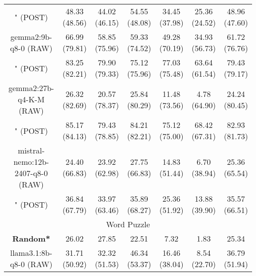 \begin{table}[]
{\begin{tabular}{ccccccc}
        

        \multicolumn{1}{c|}{" (POST)} & 48.33 (48.56) & 44.02 (46.15) & \multicolumn{1}{c|}{54.55 (48.08)} & 34.45 (37.98) & \multicolumn{1}{c|}{25.36 (24.52)} & 48.96 (47.60) \\
        \cline{1-7}
        

        \multicolumn{1}{c|}{gemma2:9b-q8-0 (RAW)} & 66.99 (79.81) & 58.85 (75.96) & \multicolumn{1}{c|}{59.33 (74.52)} & 49.28 (70.19) & \multicolumn{1}{c|}{34.93 (56.73)} & 61.72 (76.76) \\
        
        

        \multicolumn{1}{c|}{" (POST)} & 83.25 (82.21) & 79.90 (79.33) & \multicolumn{1}{c|}{75.12 (75.96)} & 77.03 (75.48) & \multicolumn{1}{c|}{63.64 (61.54)} & 79.43 (79.17) \\
        \cline{1-7}
        

        \multicolumn{1}{c|}{gemma2:27b-q4-K-M (RAW)} & 26.32 (82.69) & 20.57 (78.37) & \multicolumn{1}{c|}{25.84 (80.29)} & 11.48 (73.56) & \multicolumn{1}{c|}{4.78 (64.90)} & 24.24 (80.45) \\
        
        

        \multicolumn{1}{c|}{" (POST)} & 85.17 (84.13) & 79.43 (78.85) & \multicolumn{1}{c|}{84.21 (82.21)} & 75.12 (75.00) & \multicolumn{1}{c|}{68.42 (67.31)} & 82.93 (81.73) \\
        \cline{1-7}
        

        \multicolumn{1}{c|}{mistral-nemo:12b-2407-q8-0 (RAW)} & 24.40 (66.83) & 23.92 (62.98) & \multicolumn{1}{c|}{27.75 (66.83)} & 14.83 (51.44) & \multicolumn{1}{c|}{6.70 (38.94)} & 25.36 (65.54) \\
        
        

        \multicolumn{1}{c|}{" (POST)} & 36.84 (67.79) & 33.97 (63.46) & \multicolumn{1}{c|}{35.89 (68.27)} & 25.36 (51.92) & \multicolumn{1}{c|}{13.88 (39.90)} & 35.57 (66.51) \\
        \cline{1-7}
        
\hline
\multicolumn{7}{c}{Word Puzzle} \\ \hline
\multicolumn{1}{c|}{\textbf{Random*}} & 26.02 & 27.85 & \multicolumn{1}{c|}{22.51} & 7.32 & \multicolumn{1}{c|}{1.83} & 25.34 \\ \hline

        \multicolumn{1}{c|}{llama3.1:8b-q8-0 (RAW)} & 31.71 (50.92) & 32.32 (51.53) & \multicolumn{1}{c|}{46.34 (53.37)} & 16.46 (38.04) & \multicolumn{1}{c|}{8.54 (22.70)} & 36.79 (51.94) \\
        

\end{tabular}}
\end{table}
